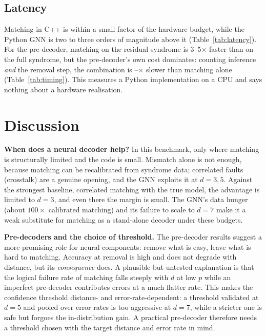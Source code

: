 \documentclass[11pt]{article}
\begin{document}
\subsection{Latency}
\begin{table}[t]
\centering\small

\caption{Median microseconds per round (graph construction plus forward pass for the GNN), $p=0.004$, S0, on CPU unless stated. Hardware needs roughly 1\,$\mu$s per round.}
\label{tab:latency}
\end{table}
\begin{table}[t]
\centering\small

\caption{Pre-decoder timing in microseconds per shot on a CPU: matching on the full syndrome and on the residual, and the pre-decoder's own cost (inference plus the removal step).}
\label{tab:timing}
\end{table}
Matching in C++ is within a small factor of the hardware budget, while the Python GNN is two to three orders of magnitude above it (Table~\ref{tab:latency}). For the pre-decoder, matching on the residual syndrome is 3--5$\times$ faster than on the full syndrome, but the pre-decoder's own cost dominates: counting inference \emph{and} the removal step, the combination is \slowMin--\slowMax$\times$ slower than matching alone (Table~\ref{tab:timing}). This measures a Python implementation on a CPU and says nothing about a hardware realisation.

\section{Discussion}
\textbf{When does a neural decoder help?} In this benchmark, only where matching is structurally limited and the code is small. Mismatch alone is not enough, because matching can be recalibrated from syndrome data; correlated faults (crosstalk) are a genuine opening, and the GNN exploits it at $d=3,5$. Against the strongest baseline, correlated matching with the true model, the advantage is limited to $d=3$, and even there the margin is small. The GNN's data hunger (about $100\times$ calibrated matching) and its failure to scale to $d=7$ make it a weak substitute for matching as a stand-alone decoder under these budgets.

\textbf{Pre-decoders and the choice of threshold.} The pre-decoder results suggest a more promising role for neural components: remove what is easy, leave what is hard to matching. Accuracy at removal is high and does not degrade with distance, but its \emph{consequence} does. A plausible but untested explanation is that the logical failure rate of matching falls steeply with $d$ at low $p$ while an imperfect pre-decoder contributes errors at a much flatter rate. This makes the confidence threshold distance- and error-rate-dependent: a threshold validated at $d=5$ and pooled over error rates is too aggressive at $d=7$, while a stricter one is safe but forgoes the in-distribution gain. A practical pre-decoder therefore needs a threshold chosen with the target distance and error rate in mind.
\end{document}
